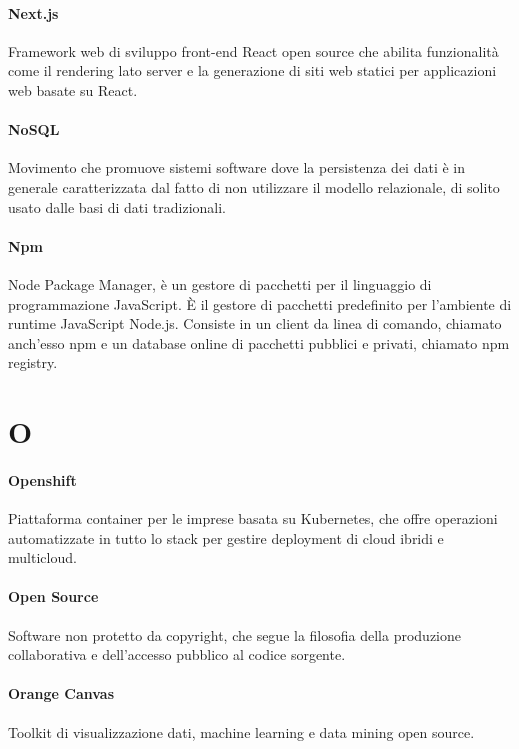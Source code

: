 \documentclass[]{article}
\begin{document}
	\paragraph*{Next.js}
	Framework web di sviluppo front-end React open source che abilita funzionalità come il rendering lato server e la generazione di siti web statici per applicazioni web basate su React.

	\paragraph*{NoSQL}
	Movimento che promuove sistemi software dove la persistenza dei dati è in generale caratterizzata dal fatto di non utilizzare il modello relazionale, di solito usato dalle basi di dati tradizionali.

	\paragraph*{Npm}
	Node Package Manager, è un gestore di pacchetti per il linguaggio di programmazione JavaScript. È il gestore di pacchetti predefinito per l'ambiente di runtime JavaScript Node.js. Consiste in un client da linea di comando, chiamato anch'esso npm e un database online di pacchetti pubblici e privati, chiamato npm registry.

	\newpage

	\section*{O}

	\paragraph*{Openshift}
	Piattaforma container per le imprese basata su Kubernetes, che offre operazioni automatizzate in tutto lo stack per gestire deployment di cloud ibridi e multicloud.

	\paragraph*{Open Source}
	Software non protetto da copyright, che segue la filosofia della produzione collaborativa e dell'accesso pubblico al codice sorgente.

	\paragraph*{Orange Canvas}
	Toolkit di visualizzazione dati, machine learning e data mining open source.
\end{document}
